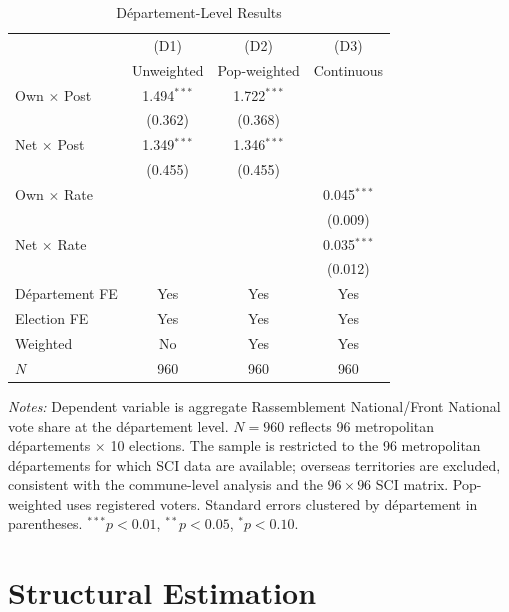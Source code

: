 \documentclass[12pt]{article}
\newcommand{\rn}{Rassemblement National}
\newcommand{\fn}{Front National}
\newcommand{\dept}{d\'{e}partement}
\newcommand{\depts}{d\'{e}partements}
\begin{document}
\begin{table}[H]
\centering
\caption{D\'{e}partement-Level Results}
\label{tab:dept}
\begin{threeparttable}
\begin{tabular}{@{}lccc@{}}
\toprule
 & (D1) & (D2) & (D3) \\
 & Unweighted & Pop-weighted & Continuous \\
\midrule
Own $\times$ Post & 1.494$^{***}$ & 1.722$^{***}$ & \\
 & (0.362) & (0.368) & \\[3pt]
Net $\times$ Post & 1.349$^{***}$ & 1.346$^{***}$ & \\
 & (0.455) & (0.455) & \\[3pt]
Own $\times$ Rate & & & 0.045$^{***}$ \\
 & & & (0.009) \\[3pt]
Net $\times$ Rate & & & 0.035$^{***}$ \\
 & & & (0.012) \\[3pt]
\midrule
D\'{e}partement FE & Yes & Yes & Yes \\
Election FE & Yes & Yes & Yes \\
Weighted & No & Yes & Yes \\
$N$ & 960 & 960 & 960 \\
\bottomrule
\end{tabular}
\begin{tablenotes}
\small
\item \textit{Notes:} Dependent variable is aggregate \rn{}/\fn{} vote share at the \dept{} level. $N = 960$ reflects 96 metropolitan \depts{} $\times$ 10 elections. The sample is restricted to the 96 metropolitan \depts{} for which SCI data are available; overseas territories are excluded, consistent with the commune-level analysis and the $96 \times 96$ SCI matrix. Pop-weighted uses registered voters. Standard errors clustered by \dept{} in parentheses. $^{***}p<0.01$, $^{**}p<0.05$, $^{*}p<0.10$.
\end{tablenotes}
\end{threeparttable}
\end{table}



\section{Structural Estimation}
\label{sec:structural}
\end{document}
